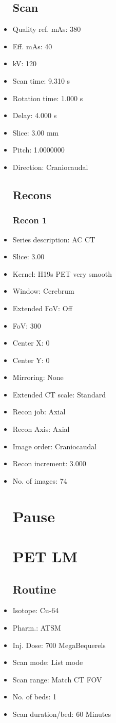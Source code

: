 \documentclass[12pt]{article}
\begin{document}
\begin{itemize}
\subsection{Scan}
\item Quality ref. mAs: 380\item Eff. mAs: 40\item kV: 120\item Scan time: 9.310 s\item Rotation time: 1.000 s\item Delay: 4.000 s\item Slice: 3.00 mm\item Pitch: 1.0000000\item Direction: Craniocaudal\subsection{Recons}

\subsubsection{Recon 1}
\item Series description: AC CT
\item Slice: 3.00
\item Kernel: H19s PET very smooth
\item Window: Cerebrum
\item Extended FoV: Off
\item FoV: 300
\item Center X: 0
\item Center Y: 0
\item Mirroring: None
\item Extended CT scale: Standard
\item Recon job: Axial
\item Recon Axis: Axial
\item Image order: Craniocaudal
\item Recon increment: 3.000
\item No. of images: 74
\section{Pause}
\section{PET LM}\subsection{Routine}
\item Isotope: Cu-64
\item Pharm.: ATSM
\item Inj. Dose: 700 MegaBequerels
\item Scan mode: List mode
\item Scan range: Match CT FOV
\item No. of beds: 1
\item Scan duration/bed: 60 Minutes

\end{itemize}
\end{document}
